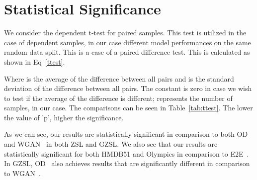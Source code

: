 \documentclass[runningheads]{llncs}
\begin{document}
\section{Statistical Significance}
\label{sec:significance}

We consider the dependent t-test for paired samples. This test is utilized in the case of dependent samples, in our case different model performances on the same random data split. This is a case of a paired difference test. This is calculated as shown in Eq~\ref{ttest}.



Where  is the average of the difference between all pairs and  is the standard deviation of the difference between all pairs. The constant  is zero in case we wish to test if the average of the difference is different;  represents the number of samples,  in our case. The comparisons can be seen in Table~\ref{tab:ttest}. The lower the value of 'p', higher the significance.

As we can see, our results are statistically significant in comparison to both OD~\cite{OD} and WGAN~\cite{clswgan} in both ZSL and GZSL. We also see that our results are statistically significant for both HMDB51 and Olympics in comparison to E2E~\cite{e2e}. In GZSL, OD~\cite{OD} also achieves results that are significantly different in comparison to WGAN~\cite{clswgan}.
\end{document}
